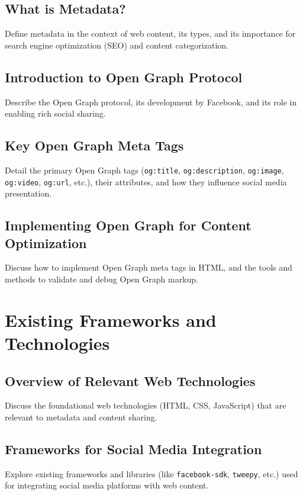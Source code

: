 \subsection{What is Metadata?}
\label{subsec:what_is_metadata}
Define metadata in the context of web content, its types, and its importance for search engine optimization (SEO) and content categorization.

\subsection{Introduction to Open Graph Protocol}
\label{subsec:introduction_to_open_graph_protocol}
Describe the Open Graph protocol, its development by Facebook, and its role in enabling rich social sharing.

\subsection{Key Open Graph Meta Tags}
\label{subsec:key_open_graph_meta_tags}
Detail the primary Open Graph tags (\texttt{og:title}, \texttt{og:description}, \texttt{og:image}, \texttt{og:video}, \texttt{og:url}, etc.), their attributes, and how they influence social media presentation.

\subsection{Implementing Open Graph for Content Optimization}
\label{subsec:implementing_open_graph_for_content_optimization}
Discuss how to implement Open Graph meta tags in HTML, and the tools and methods to validate and debug Open Graph markup.

\section{Existing Frameworks and Technologies}
\label{sec:frameworks_technologies}

\subsection{Overview of Relevant Web Technologies}
\label{subsec:overview_of_relevant_web_technologies}
Discuss the foundational web technologies (HTML, CSS, JavaScript) that are relevant to metadata and content sharing.

\subsection{Frameworks for Social Media Integration}
\label{subsec:frameworks_for_social_media_integration}
Explore existing frameworks and libraries (like \texttt{facebook-sdk}, \texttt{tweepy}, etc.) used for integrating social media platforms with web content.

